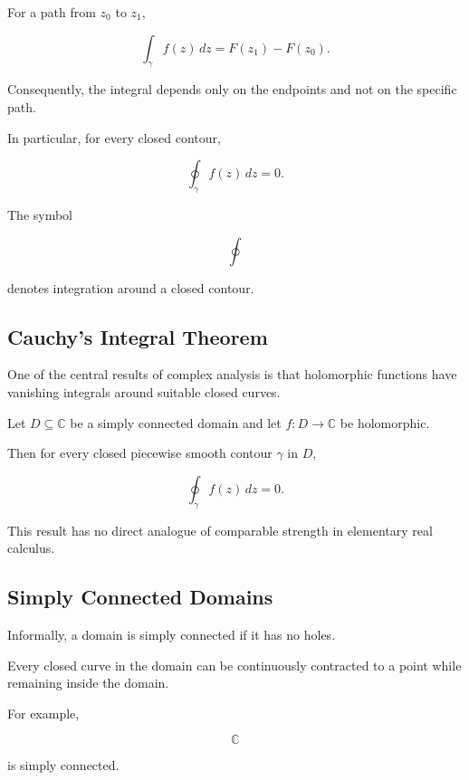 For a path from \(z_0\) to \(z_1\),

\[
\boxed{
\int_\gamma f(z)\,dz
=
F(z_1)-F(z_0).
}
\]

Consequently, the integral depends only on the endpoints and not on the
specific path.

In particular, for every closed contour,

\[
\boxed{
\oint_\gamma f(z)\,dz=0.
}
\]

The symbol

\[
\oint
\]

denotes integration around a closed contour.

\subsection{Cauchy's Integral Theorem}
\label{subsec:cauchy-integral-theorem}

One of the central results of complex analysis is that holomorphic
functions have vanishing integrals around suitable closed curves.

\begin{theorem}
Let \(D\subseteq\mathbb{C}\) be a simply connected domain and let
\(f:D\to\mathbb{C}\) be holomorphic.

Then for every closed piecewise smooth contour \(\gamma\) in \(D\),

\[
\boxed{
\oint_\gamma f(z)\,dz=0.
}
\]
\end{theorem}

This result has no direct analogue of comparable strength in elementary
real calculus.

\subsection{Simply Connected Domains}
\label{subsec:simply-connected-complex}

Informally, a domain is simply connected if it has no holes.

Every closed curve in the domain can be continuously contracted to a
point while remaining inside the domain.

For example,

\[
\mathbb{C}
\]

is simply connected.

